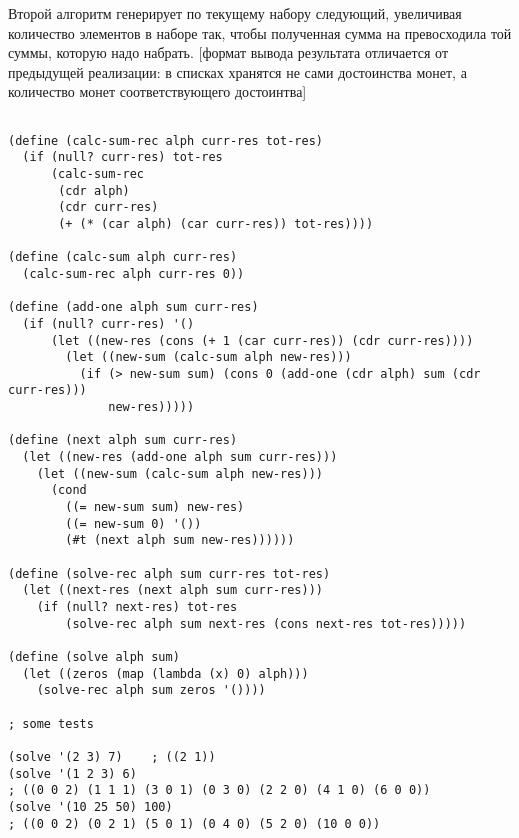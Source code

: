 \documentclass[10pt,a4paper]{article}
\begin{document}
Второй алгоритм генерирует по текущему набору следующий, увеличивая
количество элементов в наборе так, чтобы полученная сумма на
превосходила той суммы, которую надо набрать.
[формат вывода результата отличается от предыдущей реализации: в
списках хранятся не сами достоинства монет, а количество монет
соответствующего достоинтва]
\begin{lstlisting}

(define (calc-sum-rec alph curr-res tot-res)
  (if (null? curr-res) tot-res
      (calc-sum-rec
       (cdr alph)
       (cdr curr-res)
       (+ (* (car alph) (car curr-res)) tot-res))))

(define (calc-sum alph curr-res)
  (calc-sum-rec alph curr-res 0))
  
(define (add-one alph sum curr-res)
  (if (null? curr-res) '()
      (let ((new-res (cons (+ 1 (car curr-res)) (cdr curr-res))))
        (let ((new-sum (calc-sum alph new-res)))
          (if (> new-sum sum) (cons 0 (add-one (cdr alph) sum (cdr curr-res)))
              new-res)))))

(define (next alph sum curr-res)
  (let ((new-res (add-one alph sum curr-res)))
    (let ((new-sum (calc-sum alph new-res)))
      (cond
        ((= new-sum sum) new-res)
        ((= new-sum 0) '())
        (#t (next alph sum new-res)))))) 

(define (solve-rec alph sum curr-res tot-res)
  (let ((next-res (next alph sum curr-res)))
    (if (null? next-res) tot-res
        (solve-rec alph sum next-res (cons next-res tot-res)))))

(define (solve alph sum)
  (let ((zeros (map (lambda (x) 0) alph)))
    (solve-rec alph sum zeros '())))

; some tests

(solve '(2 3) 7)    ; ((2 1))
(solve '(1 2 3) 6)
; ((0 0 2) (1 1 1) (3 0 1) (0 3 0) (2 2 0) (4 1 0) (6 0 0))
(solve '(10 25 50) 100)
; ((0 0 2) (0 2 1) (5 0 1) (0 4 0) (5 2 0) (10 0 0))


\end{lstlisting}
\end{document}
